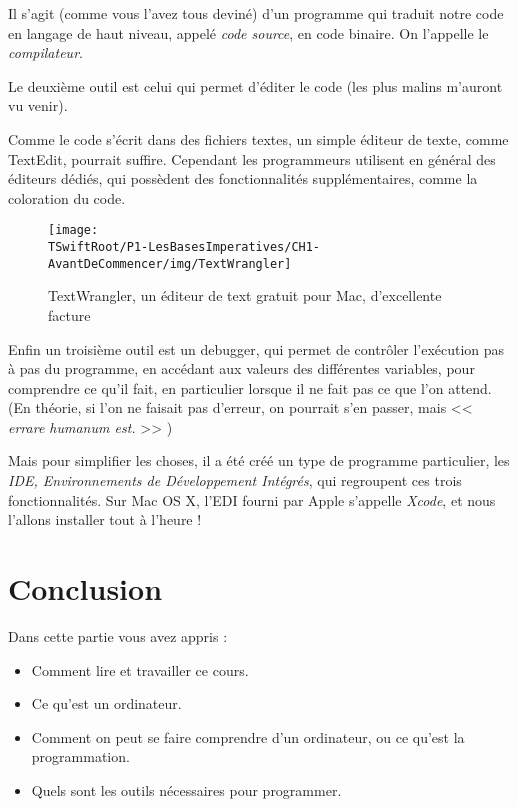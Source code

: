 Il s'agit (comme vous l'avez tous deviné) d'un programme
qui traduit notre code en langage de haut niveau, appelé \emph{code source}, en code binaire.
On l'appelle le \emph{compilateur}.

%

Le deuxième outil est celui qui permet d'éditer le code (les plus malins m'auront vu venir).

Comme le code s'écrit dans des fichiers textes, un simple éditeur de texte,
comme TextEdit, pourrait suffire.
Cependant les programmeurs utilisent en général des éditeurs dédiés,
qui possèdent des fonctionnalités supplémentaires, comme la coloration du code.
\begin{figure}[H]
\centering
\texttt{[image: \\TSwiftRoot/P1-LesBasesImperatives/CH1-AvantDeCommencer/img/TextWrangler]}
\caption{TextWrangler, un éditeur de text gratuit pour Mac, d'excellente facture}
\end{figure}

Enfin un troisième outil est un debugger,
qui permet de contrôler l'exécution pas à pas du programme,
en accédant aux valeurs des différentes variables,
pour comprendre ce qu'il fait,
en particulier lorsque il ne fait pas ce que l'on attend.
(En théorie, si l'on ne faisait pas d'erreur,
on pourrait s'en passer,
mais << \emph{errare humanum est.} >> )

Mais pour simplifier les choses, il a été créé un type de programme particulier,
les \emph{IDE, Environnements de Développement Intégrés},
qui regroupent ces trois fonctionnalités.
Sur Mac OS X, l'EDI fourni par Apple s'appelle \emph{Xcode},
et nous l'allons installer tout à l'heure !

\section*{Conclusion}
{}
Dans cette partie vous avez appris :
\begin{itemize}
\item Comment lire et travailler ce cours.
\item Ce qu'est un ordinateur.
\item Comment on peut se faire comprendre d'un ordinateur,
ou ce qu'est la programmation.
\item Quels sont les outils nécessaires pour programmer.
\end{itemize}

